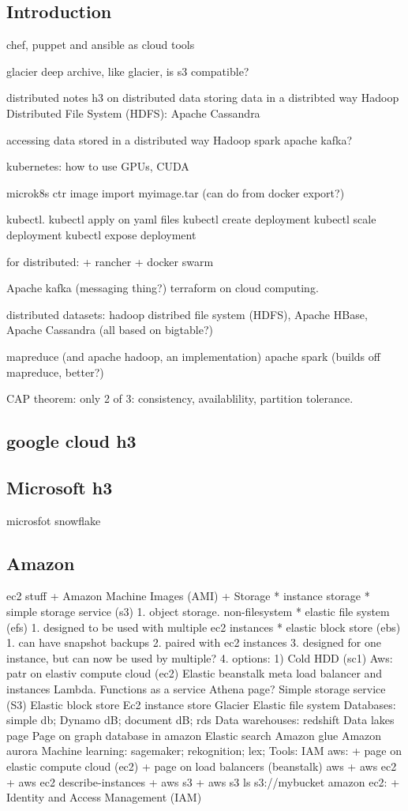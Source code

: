 
\subsection{Introduction}

chef, puppet and ansible as cloud tools

glacier deep archive, like glacier, is s3 compatible?

distributed notes
	h3 on distributed data
		storing data in a distribted way
			Hadoop Distributed File System (HDFS):
			Apache Cassandra

		accessing data stored in a distributed way
			Hadoop
			spark
		apache kafka?

kubernetes: how to use GPUs, CUDA

microk8s ctr image import myimage.tar (can do from docker export?)

kubectl. kubectl apply on yaml files
kubectl create deployment
kubectl scale deployment
kubectl expose deployment

for distributed:
+ rancher
+ docker swarm

Apache kafka (messaging thing?)
terraform on cloud computing.

distributed datasets: hadoop distribed file system (HDFS), Apache HBase, Apache Cassandra (all based on bigtable?)

mapreduce (and apache hadoop, an implementation)
apache spark (builds off mapreduce, better?)

CAP theorem: only 2 of 3: consistency, availablility, partition tolerance.
\subsection{google cloud h3}
\subsection{Microsoft h3}
microsfot snowflake
\subsection{Amazon}
ec2 stuff
+ Amazon Machine Images (AMI)
+ Storage
  * instance storage
  * simple storage service (s3)
    1. object storage. non-filesystem
  * elastic file system (efs)
    1. designed to be used with multiple ec2 instances
  * elastic block store (ebs)
    1. can have snapshot backups
    2. paired with ec2 instances
    3. designed for one instance, but can now be used by multiple?
    4. options:
       1) Cold HDD (sc1)
Aws: patr on elastiv compute cloud (ec2)
Elastic beanstalk meta load balancer and instances
Lambda. Functions as a service
Athena page?
Simple storage service (S3)
Elastic block store
Ec2 instance store
Glacier
Elastic file system
Databases: simple db; Dynamo dB; document dB; rds
Data warehouses: redshift
Data lakes page
Page on graph database in amazon
Elastic search
Amazon glue
Amazon aurora
Machine learning: sagemaker; rekognition; lex;
Tools: IAM
aws:
+ page on elastic compute cloud (ec2)
+ page on load balancers (beanstalk)
aws
+ aws ec2
+ aws ec2 describe-instances
+ aws s3
+ aws s3 ls s3://mybucket
amazon ec2:
+ Identity and Access Management (IAM)

